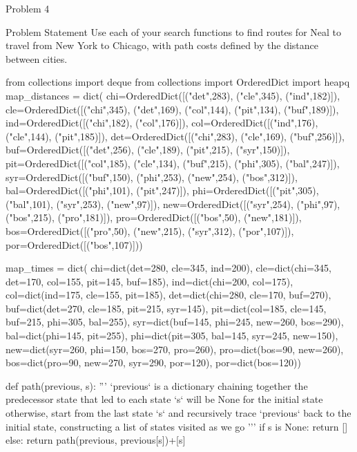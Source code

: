 \begin{problem}{Problem 4}
    \begin{statement}{Problem Statement}
        Use each of your search functions to find routes for Neal to travel from New York to Chicago, with path costs defined by the distance between cities.
    \end{statement}
    
    \begin{highlight}[Solution]
    \begin{code}[Python]
    from collections import deque
    from collections import OrderedDict
    import heapq
    map_distances = dict(
        chi=OrderedDict([("det",283), ("cle",345), ("ind",182)]),
        cle=OrderedDict([("chi",345), ("det",169), ("col",144), ("pit",134), ("buf",189)]),
        ind=OrderedDict([("chi",182), ("col",176)]),
        col=OrderedDict([("ind",176), ("cle",144), ("pit",185)]),
        det=OrderedDict([("chi",283), ("cle",169), ("buf",256)]),
        buf=OrderedDict([("det",256), ("cle",189), ("pit",215), ("syr",150)]),
        pit=OrderedDict([("col",185), ("cle",134), ("buf",215), ("phi",305), ("bal",247)]),
        syr=OrderedDict([("buf",150), ("phi",253), ("new",254), ("bos",312)]),
        bal=OrderedDict([("phi",101), ("pit",247)]),
        phi=OrderedDict([("pit",305), ("bal",101), ("syr",253), ("new",97)]),
        new=OrderedDict([("syr",254), ("phi",97), ("bos",215), ("pro",181)]),
        pro=OrderedDict([("bos",50), ("new",181)]),
        bos=OrderedDict([("pro",50), ("new",215), ("syr",312), ("por",107)]),
        por=OrderedDict([("bos",107)]))
        
    map_times = dict(
        chi=dict(det=280, cle=345, ind=200),
        cle=dict(chi=345, det=170, col=155, pit=145, buf=185),
        ind=dict(chi=200, col=175),
        col=dict(ind=175, cle=155, pit=185),
        det=dict(chi=280, cle=170, buf=270),
        buf=dict(det=270, cle=185, pit=215, syr=145),
        pit=dict(col=185, cle=145, buf=215, phi=305, bal=255),
        syr=dict(buf=145, phi=245, new=260, bos=290),
        bal=dict(phi=145, pit=255),
        phi=dict(pit=305, bal=145, syr=245, new=150),
        new=dict(syr=260, phi=150, bos=270, pro=260),
        pro=dict(bos=90, new=260),
        bos=dict(pro=90, new=270, syr=290, por=120),
        por=dict(bos=120))
    
    def path(previous, s): 
        '''
        `previous` is a dictionary chaining together the predecessor state that led to each state
        `s` will be None for the initial state
        otherwise, start from the last state `s` and recursively trace `previous` back to the initial state,
        constructing a list of states visited as we go
        '''
        if s is None:
            return []
        else:
            return path(previous, previous[s])+[s]
    

\end{code}
\end{highlight}
\end{problem}
